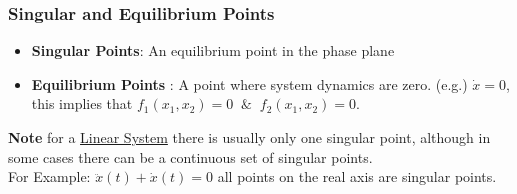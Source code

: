 \documentclass[11pt,handout]{beamer}   %
\begin{document}
\begin{frame}
\frametitle{Singular and Equilibrium Points}
\begin{itemize}
\item \textbf{Singular Points}: An equilibrium point in the phase plane
\item \textbf{Equilibrium Points} : A point where system dynamics are zero. (e.g.) $\dot{x} = 0$, this implies that $f_1(x_1,x_2) = 0 \;\; \&  \;\; f_2(x_1,x_2) = 0$.
\end{itemize}
\textbf{Note} for a \underline{Linear System} there is usually only one singular point, although in some cases there can be a continuous set of singular points. \\
For Example: $\ddot{x}(t) + \dot{x}(t) = 0$ all points on the real axis are singular points.
\end{frame}
\end{document}
